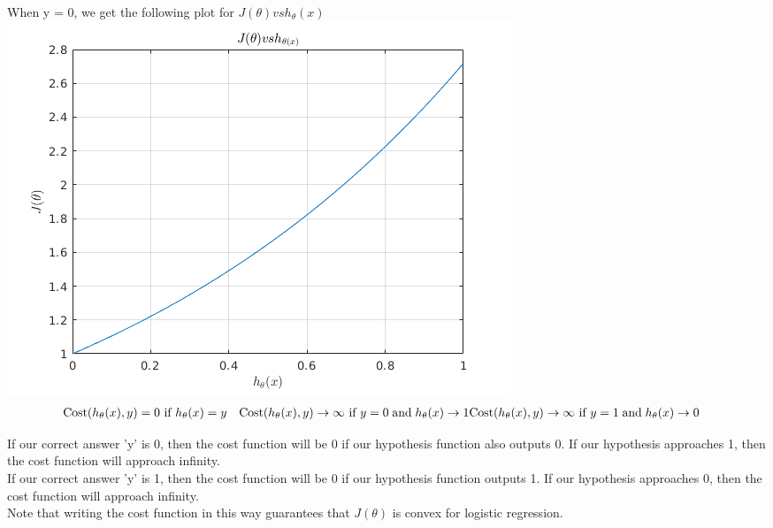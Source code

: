 When y = 0, we get the following plot for $J(\theta) vs h_{\theta}(x)$\\
\includegraphics{matlab/logistic_cost_2.png} \\

\begin{equation}
  \begin{aligned}
    & \mathrm{Cost}(h_\theta(x),y) = 0 \text{ if } h_\theta(x) = y \newline
    & \mathrm{Cost}(h_\theta(x),y) \rightarrow \infty \text{ if } y = 0 \; \mathrm{and} \; h_\theta(x) \rightarrow 1 \newline
    & \mathrm{Cost}(h_\theta(x),y) \rightarrow \infty \text{ if } y = 1 \; \mathrm{and} \; h_\theta(x) \rightarrow 0 \newline
  \end{aligned}
\end{equation}

If our correct answer 'y' is 0, then the cost function will be 0 if our hypothesis function also outputs 0. If our hypothesis approaches 1, then the cost function will approach infinity.\\

If our correct answer 'y' is 1, then the cost function will be 0 if our hypothesis function outputs 1. If our hypothesis approaches 0, then the cost function will approach infinity.\\

Note that writing the cost function in this way guarantees that $J(\theta)$ is convex for logistic regression.\\ 


